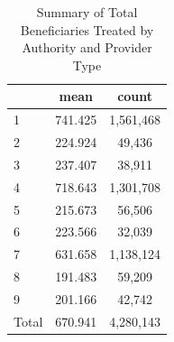 \begin{table}[htbp]\centering
\def\sym#1{\ifmmode^{#1}\else\(^{#1}\)\fi}
\caption{Summary of Total Beneficiaries Treated by Authority and Provider Type}
\begin{tabular}{l*{1}{cc}}
\toprule
                    &        mean&       count\\
\midrule
1                   &     741.425&   1,561,468\\
2                   &     224.924&      49,436\\
3                   &     237.407&      38,911\\
4                   &     718.643&   1,301,708\\
5                   &     215.673&      56,506\\
6                   &     223.566&      32,039\\
7                   &     631.658&   1,138,124\\
8                   &     191.483&      59,209\\
9                   &     201.166&      42,742\\
Total               &     670.941&   4,280,143\\
\bottomrule
\end{tabular}
\end{table}
